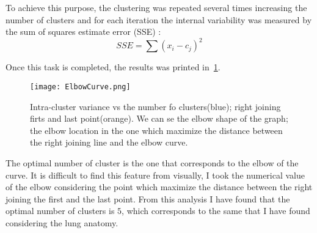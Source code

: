 \documentclass{standalone}
\begin{document}
	To achieve this purpose, the clustering was repeated several times increasing the number of clusters and for each iteration the internal variability was measured by the sum of squares estimate error (SSE) : 
	\begin{equation}\label{eq:SumOfSquare}
		SSE = \sum (x_i - c_j)^2
	\end{equation}
	
	Once this task is completed, the results was printed in \figurename\,\ref{fig:ElbowCurve}. 
	
	\begin{figure}[h!]
		\centering
		\texttt{[image: ElbowCurve.png]}
		\caption{Intra-cluster variance vs the number fo clusters(blue); right joining firts and last point(orange). We can se the elbow shape of the graph; the elbow location in the one which maximize the distance between the right joining line and the elbow curve.}\label{fig:ElbowCurve}
	\end{figure}

	The optimal number of cluster is the one that corresponds to the elbow of the curve. It is difficult to find this feature from visually, I took the numerical value of the elbow considering the point which maximize the distance between the right joining the first and the last point.
	From this analysis I have found that the optimal number of clusters is $5$, which corresponds to the same that I have found considering the lung anatomy.
	
\end{document}
